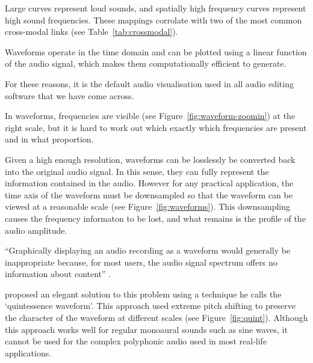 Large curves represent loud sounds, and spatially high frequency curves represent high sound frequencies. These
mappings corrolate with two of the most common cross-modal links (see Table~\ref{tab:crossmodal}).

Waveforms operate in the time domain and can be plotted using a linear function of the audio signal, which makes them
computationally efficient to generate. 

For these reasons, it is the default audio visualisation used in all audio editing software that we have come across.


In waveforms, frequencies are visible (see Figure~\ref{fig:waveform-zoomin}) at the right scale, but it is hard to work
out which exactly which frequencies are present and in what proportion.

Given a high enough resolution, waveforms can be losslessly be converted back into the original audio signal. In this
sense, they can fully represent the information contained in the audio. However for any practical application, the
time axis of the waveform must be downsampled so that the waveform can be viewed at a reasonable scale (see
Figure~\ref{fig:waveforms}).  This downsampling causes the frequency informaton to be lost, and what remains is the
profile of the audio amplitude.

``Graphically displaying an audio recording as a waveform would generally be inappropriate because, for most users, the
audio signal spectrum offers no information about content'' \citep{Bouamrane2007}.

\citet{Loviscach2011}
proposed an elegant solution to this problem using a technique he calls the `quintessence waveform'. This approach
used extreme pitch shifting to preserve the character of the waveform at different scales (see Figure~\ref{fig:quint}).
Although this approach works well for regular monoaural sounds such as sine waves, it cannot be used for the complex
polyphonic audio used in most real-life applications.

